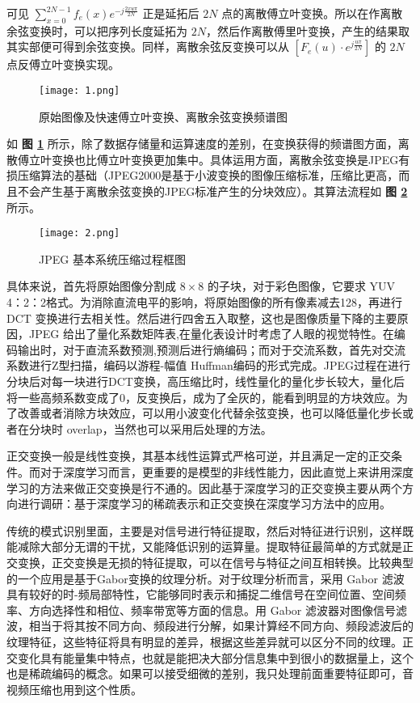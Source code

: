 可见 $\sum_{x=0}^{2 N-1} f_e(x) e^{-j \frac{2 x u \pi}{2 N}}$ 正是延拓后 $2N$ 点的离散傅立叶变换。所以在作离散余弦变换时，可以把序列长度延拓为 $2N$，然后作离散傅里叶变换，产生的结果取其实部便可得到余弦变换。同样，离散余弦反变换可以从 $\left[F_e(u) \cdot e^{j \frac{u \pi}{2 N}}\right]$ 的 $2N$ 点反傅立叶变换实现。

\begin{figure}[!ht]
	\centering
	\texttt{[image: 1.png]}
	\caption{原始图像及快速傅立叶变换、离散余弦变换频谱图}
	\label{fig:fig1}
\end{figure}

如 \textbf{图 \ref{fig:fig1}} 所示，除了数据存储量和运算速度的差别，在变换获得的频谱图方面，离散傅立叶变换也比傅立叶变换更加集中。具体运用方面，离散余弦变换是JPEG有损压缩算法的基础（JPEG2000是基于小波变换的图像压缩标准，压缩比更高，而且不会产生基于离散余弦变换的JPEG标准产生的分块效应）。其算法流程如 \textbf{图 \ref{fig:fig2}} 所示。

\begin{figure}[!ht]
	\centering
	\texttt{[image: 2.png]}
	\caption{JPEG 基本系统压缩过程框图}
	\label{fig:fig2}
	\vspace{-0.6cm}
\end{figure}

具体来说，首先将原始图像分割成 $8\times 8$ 的子块，对于彩色图像，它要求 YUV 4：2：2格式。为消除直流电平的影响，将原始图像的所有像素减去128，再进行 DCT 变换进行去相关性。然后进行四舍五入取整，这也是图像质量下降的主要原因，JPEG 给出了量化系数矩阵表,在量化表设计时考虑了人眼的视觉特性。在编码输出时，对于直流系数预测,预测后进行熵编码；而对于交流系数，首先对交流系数进行Z型扫描，编码以游程-幅值 Huffman编码的形式完成。JPEG过程在进行分块后对每一块进行DCT变换，高压缩比时，线性量化的量化步长较大，量化后将一些高频系数变成了0，反变换后，成为了全灰的，能看到明显的方块效应。为了改善或者消除方块效应，可以用小波变化代替余弦变换，也可以降低量化步长或者在分块时 overlap，当然也可以采用后处理的方法。

正交变换一般是线性变换，其基本线性运算式严格可逆，并且满足一定的正交条件。而对于深度学习而言，更重要的是模型的非线性能力，因此直觉上来讲用深度学习的方法来做正交变换是行不通的。因此基于深度学习的正交变换主要从两个方向进行调研：基于深度学习的稀疏表示和正交变换在深度学习方法中的应用。

传统的模式识别里面，主要是对信号进行特征提取，然后对特征进行识别，这样既能减除大部分无谓的干扰，又能降低识别的运算量。提取特征最简单的方式就是正交变换，正交变换是无损的特征提取，可以在信号与特征之间互相转换。比较典型的一个应用是基于Gabor变换的纹理分析。对于纹理分析而言，采用 Gabor 滤波具有较好的时-频局部特性，它能够同时表示和捕捉二维信号在空间位置、空间频率、方向选择性和相位、频率带宽等方面的信息。用 Gabor 滤波器对图像信号滤波，相当于将其按不同方向、频段进行分解，如果计算经不同方向、频段滤波后的纹理特征，这些特征将具有明显的差异，根据这些差异就可以区分不同的纹理。正交变化具有能量集中特点，也就是能把决大部分信息集中到很小的数据量上，这个也是稀疏编码的概念。如果可以接受细微的差别，我只处理前面重要特征即可，音视频压缩也用到这个性质。

